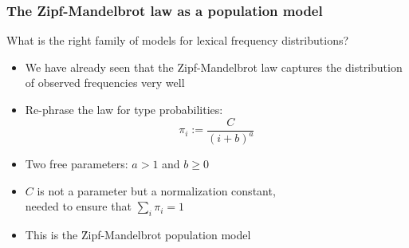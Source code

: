 \documentclass[t]{beamer} %
\begin{document}
\begin{frame}
  \frametitle{The Zipf-Mandelbrot law as a population model}

  What is the right family of models for lexical frequency distributions?
  \begin{itemize}
  \item We have already seen that the Zipf-Mandelbrot law captures the
    distribution of observed frequencies very well%
    \pause
  \item Re-phrase the law for type probabilities:
    \[ \pi_i := \frac{C}{(i + b) ^ a} \]
  \item Two free parameters: $a > 1$ and $b \geq 0$
  \item $C$ is not a parameter but a normalization constant,\\
    needed to ensure that $\sum_i \pi_i = 1$
  \item This is the \h{Zipf-Mandelbrot} population model
  \end{itemize}
\end{frame}
\end{document}
